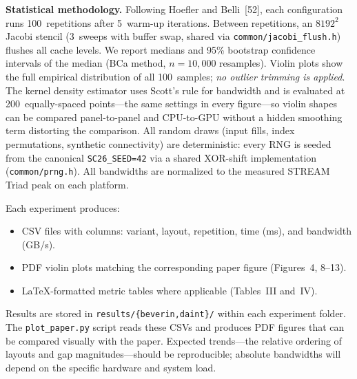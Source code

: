 \documentclass[conference]{IEEEtran}
\begin{document}
\textbf{Statistical methodology.}
Following Hoefler and Belli~[52], each configuration runs 100~repetitions after 5~warm-up iterations.
Between repetitions, an $8192^2$ Jacobi stencil (3~sweeps with buffer swap, shared via \texttt{common/jacobi\_flush.h}) flushes all cache levels.
We report medians and 95\% bootstrap confidence intervals of the median (BCa method, $n=10{,}000$ resamples).
Violin plots show the full empirical distribution of all 100~samples; \emph{no outlier trimming is applied}.
The kernel density estimator uses Scott's rule for bandwidth and is evaluated at 200~equally-spaced points---the same settings in every figure---so violin shapes can be compared panel-to-panel and CPU-to-GPU without a hidden smoothing term distorting the comparison.
All random draws (input fills, index permutations, synthetic connectivity) are deterministic: every RNG is seeded from the canonical \texttt{SC26\_SEED=42} via a shared XOR-shift implementation (\texttt{common/prng.h}).
All bandwidths are normalized to the measured STREAM Triad peak on each platform.

\artout

Each experiment produces:
\begin{itemize}
\item CSV files with columns: variant, layout, repetition, time (ms), and bandwidth (GB/s).
\item PDF violin plots matching the corresponding paper figure (Figures~4, 8--13).
\item LaTeX-formatted metric tables where applicable (Tables~III and~IV).
\end{itemize}

Results are stored in \texttt{results/\{beverin,daint\}/} within each experiment folder.
The \texttt{plot\_paper.py} script reads these CSVs and produces PDF figures that can be compared visually with the paper.
Expected trends---the relative ordering of layouts and gap magnitudes---should be reproducible; absolute bandwidths will depend on the specific hardware and system load.
\end{document}
